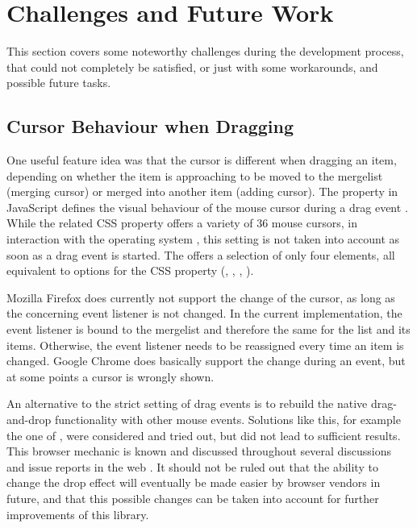 \section{Challenges and Future Work}
\label{sec:challenges}

This section covers some noteworthy challenges during the development
process, that could not completely be satisfied, or just with some
workarounds, and possible future tasks.



\subsection{Cursor Behaviour when Dragging}

One useful feature idea was that the cursor is different when dragging
an item, depending on whether the item is approaching to be moved to the
mergelist (merging cursor) or merged into another item (adding cursor).
The  property in JavaScript defines
the visual behaviour of the mouse cursor during a drag event
\parencite{mdn-dropeffect}. While the related CSS 
property offers a variety of 36 mouse cursors, in interaction with the
operating system \parencite{mdn-cursor}, this setting is not taken into
account as soon as a drag event is started. The 
offers a selection of only four elements, all equivalent to options for
the CSS property (, , ,
).

Mozilla Firefox does currently not support the change of the cursor, as
long as the concerning event listener is not changed. In the current
implementation, the event listener is bound to the mergelist and
therefore the same for the list and its items. Otherwise, the event
listener needs to be reassigned every time an item is changed. Google
Chrome does basically support the change during an event, but at some
points a  cursor is wrongly shown.

An alternative to the strict  setting of drag events
is to rebuild the native drag-and-drop functionality with other mouse
events. Solutions like this, for example the one of
\textcite{gunduz-mouseover}, were considered and tried out, but did not
lead to sufficient results. This browser mechanic is known and discussed
throughout several discussions and issue reports in the web
\parencite{chromium-cursorissue,horowitz-customizecursor}. It should not
be ruled out that the ability to change the drop effect will eventually
be made easier by browser vendors in future, and that this possible
changes can be taken into account for further improvements of this
library.



